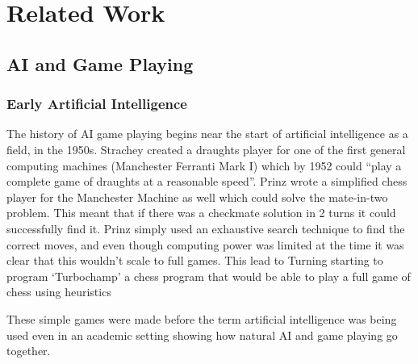 \documentclass[a4paper]{article}
\begin{document}
\pagebreak
\section{Related Work}
\subsection{AI and Game Playing}
\subsubsection{Early Artificial Intelligence}
The history of AI game playing begins near the start of artificial intelligence as a field, in the 1950s.
Strachey created a draughts player for one of the first general computing machines (Manchester Ferranti Mark I) which by  1952 could ``play a complete game of draughts at a reasonable speed''\cite{BreifHistoryComputing}.
Prinz wrote a simplified chess player for the Manchester Machine as well which could solve the mate-in-two problem.
This meant that if there was a checkmate solution in 2 turns it could successfully find it\cite{BreifHistoryComputing}.
Prinz simply used an exhaustive search technique to find the correct moves, and even though computing power was limited at the time it was clear that this wouldn't scale to full games.
This lead to Turning starting to program `Turbochamp' a chess program that would be able to play a full game of chess using heuristics\cite{BreifHistoryComputing}
\par
These simple games were made before the term artificial intelligence was being used even in an academic setting showing how natural AI and game playing go together.
\end{document}
